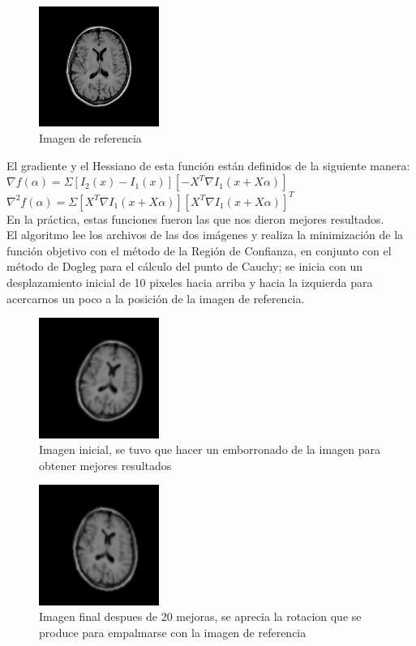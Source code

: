\documentclass[10pt,journal,compsoc]{styles/IEEEtran}
\begin{document}
\begin{figure}[hbtp]
\centering
\includegraphics[width=0.35\textwidth]{mriReferencia.png}
\caption{Imagen de referencia}
\end{figure}

El gradiente y el Hessiano de esta funci\'on est\'an definidos de la siguiente manera:\\

$\nabla f(\alpha)=\Sigma[I_2(x)-I_1(x)][-X^T \nabla I_1(x+X\alpha)]$\\
$\nabla^2 f(\alpha)=\Sigma[X^T \nabla I_1(x+X\alpha)][X^T \nabla I_1(x+X\alpha)]^T$\\

En la pr\'actica, estas funciones fueron las que nos dieron mejores resultados.\\

El algoritmo lee los archivos de las dos im\'agenes y realiza la minimizaci\'on de la funci\'on objetivo con el m\'etodo de la Regi\'on de Confianza, en conjunto con el m\'etodo de Dogleg para el c\'alculo del punto de Cauchy; se inicia con un desplazamiento inicial de 10 pixeles hacia arriba y hacia la izquierda para acercarnos un poco a la posici\'on de la imagen de referencia.

\begin{figure}[hbtp]
\centering
\includegraphics[width=0.35\textwidth]{mriCinicial.png}
\caption{Imagen inicial, se tuvo que hacer un emborronado de la imagen para obtener mejores resultados}
\end{figure}

\begin{figure}[hbtp]
\centering
\includegraphics[width=0.35\textwidth]{mriCfinal.png}
\caption{Imagen final despues de 20 mejoras, se aprecia la rotacion que se produce para empalmarse con la imagen de referencia}
\end{figure}
\end{document}
